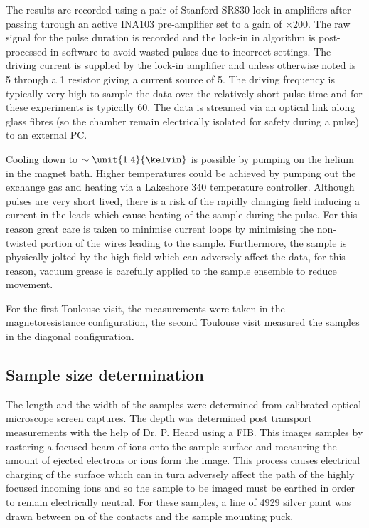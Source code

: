 The results are recorded using a pair of Stanford SR830 lock-in amplifiers after passing through an active INA103 pre-amplifier set to a gain of $\times200$. The raw signal for the pulse duration is recorded and the lock-in in algorithm is post-processed in software to avoid wasted pulses due to incorrect settings. The driving current is supplied by the lock-in amplifier and unless otherwise noted is \unit{5}{\volt} through a \unit{1}{\kilo\ohm} resistor giving a current source of \unit{5}{\milli\ampere}. The driving frequency is typically very high to sample the data over the relatively short pulse time and for these experiments is typically \unit{60}{\kilo\hertz}. The data is streamed via an optical link along glass fibres (so the chamber remain electrically isolated for safety during a pulse) to an external PC.

Cooling down to $\sim \unit{1.4}{\kelvin}$ is possible by pumping on the helium in the magnet bath. Higher temperatures could be achieved by pumping out the exchange gas and heating via a Lakeshore 340 temperature controller. Although pulses are very short lived, there is a risk of the rapidly changing field inducing a current in the leads which cause heating of the sample during the pulse. For this reason great care is taken to minimise current loops by minimising the non-twisted portion of the wires leading to the sample. Furthermore, the sample is physically jolted by the high field which can adversely affect the data, for this reason, vacuum grease is carefully applied to the sample ensemble to reduce movement.

For the first Toulouse visit, the measurements were taken in the magnetoresistance configuration, the second Toulouse visit measured the samples in the diagonal configuration.

\subsection{Sample size determination}

The length and the width of the samples were determined from calibrated optical microscope screen captures. The depth was determined post transport measurements with the help of Dr. P. Heard using a \ac{FIB}. This images samples by rastering a focused beam of ions onto the sample surface and measuring the amount of ejected electrons or ions form the image. This process causes electrical charging of the surface which can in turn adversely affect the path of the highly focused incoming ions and so the sample to be imaged must be earthed in order to remain electrically neutral. For these samples, a line of 4929 silver paint was drawn between on of the contacts and the sample mounting puck.

